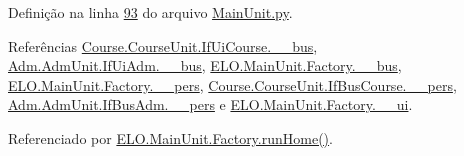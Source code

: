 Definição na linha \hyperlink{MainUnit_8py_source_l00093}{93} do arquivo \hyperlink{MainUnit_8py_source}{Main\-Unit.\-py}.



Referências \hyperlink{CourseUnit_8py_source_l00025}{Course.\-Course\-Unit.\-If\-Ui\-Course.\-\_\-\-\_\-bus}, \hyperlink{AdmUnit_8py_source_l00031}{Adm.\-Adm\-Unit.\-If\-Ui\-Adm.\-\_\-\-\_\-bus}, \hyperlink{MainUnit_8py_source_l00038}{E\-L\-O.\-Main\-Unit.\-Factory.\-\_\-\-\_\-bus}, \hyperlink{MainUnit_8py_source_l00039}{E\-L\-O.\-Main\-Unit.\-Factory.\-\_\-\-\_\-pers}, \hyperlink{CourseUnit_8py_source_l00051}{Course.\-Course\-Unit.\-If\-Bus\-Course.\-\_\-\-\_\-pers}, \hyperlink{AdmUnit_8py_source_l00061}{Adm.\-Adm\-Unit.\-If\-Bus\-Adm.\-\_\-\-\_\-pers} e \hyperlink{MainUnit_8py_source_l00037}{E\-L\-O.\-Main\-Unit.\-Factory.\-\_\-\-\_\-ui}.



Referenciado por \hyperlink{classELO_1_1MainUnit_1_1Factory_a766943202ba781821cf749ca0fb133ba}{E\-L\-O.\-Main\-Unit.\-Factory.\-run\-Home()}.



